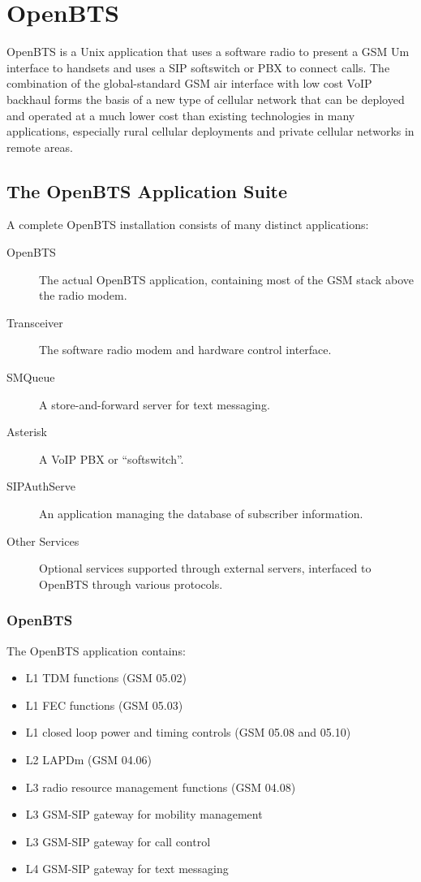 \chapter{OpenBTS}

OpenBTS is a Unix application that uses a software radio to present a GSM Um interface 
to handsets and uses a SIP softswitch or PBX to connect calls.
The combination of the global-standard GSM air interface with low cost VoIP backhaul 
forms the basis of a new type of cellular network that can be deployed and operated at a much lower
cost than existing technologies in many applications, 
especially rural cellular deployments and private cellular networks in remote areas.

\section{The OpenBTS Application Suite}
A complete OpenBTS installation consists of many distinct applications:

\begin{description}
\item[OpenBTS] The actual OpenBTS application, containing most of the GSM stack above the radio modem.
\item[Transceiver] The software radio modem and hardware control interface.
\item[SMQueue] A store-and-forward server for text messaging.
\item[Asterisk] A VoIP PBX or ``softswitch''.
\item[SIPAuthServe] An application managing the database of subscriber information.
\item[Other Services] Optional services supported through external servers, interfaced to OpenBTS through
various protocols.
\end{description}


\subsection{OpenBTS}
The OpenBTS application contains:
\begin{itemize}
\item L1 TDM functions (GSM 05.02)
\item L1 FEC functions (GSM 05.03)
\item L1 closed loop power and timing controls (GSM 05.08 and 05.10)
\item L2 LAPDm (GSM 04.06)
\item L3 radio resource management functions (GSM 04.08)
\item L3 GSM-SIP gateway for mobility management
\item L3 GSM-SIP gateway for call control
\item L4 GSM-SIP gateway for text messaging
\end{itemize}


